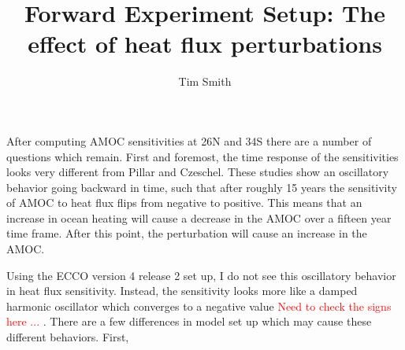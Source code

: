 \documentclass[a4paper,11pt]{article}
\title{\vspace{-10ex}Forward Experiment Setup: The effect of heat flux perturbations}
\author{Tim Smith}
\date{\vspace{-3ex}}
\newcommand{\red}[1]{\textcolor{red}{#1}}
\begin{document}
After computing AMOC sensitivities at 26N and 34S there are a number of questions which remain. First and foremost, the time response of the sensitivities looks very different from Pillar and Czeschel. These studies show an oscillatory behavior going backward in time, such that after roughly 15 years the sensitivity of AMOC to heat flux flips from negative to positive. This means that an increase in ocean heating will cause a decrease in the AMOC over a fifteen year time frame. After this point, the perturbation will cause an increase in the AMOC. 

Using the ECCO version 4 release 2 set up, I do not see this oscillatory behavior in heat flux sensitivity. Instead, the sensitivity looks more like a damped harmonic oscillator which converges to a negative value \red{Need to check the signs here ... }. There are a few differences in model set up which may cause these different behaviors. First, 
\end{document}
